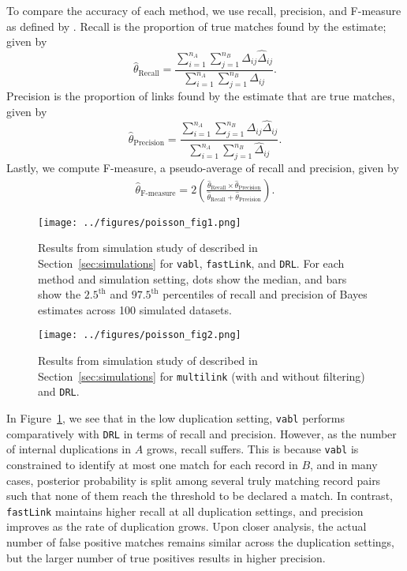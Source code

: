 \documentclass[12pt,letterpaper]{article}
\newcommand{\1}[1]{\mathbb{I}\!\left[#1\right]} %
\begin{document}
To compare the accuracy of each method, we use recall, precision, and F-measure as defined by \cite{christen_data_2012}. Recall is the proportion of true matches found by the estimate; given by
$$\hat{\theta}_{\text{Recall}} = \frac{\sum_{i=1}^{n_A}\sum_{j=1}^{n_B} \Delta_{ij} \hat{\Delta}_{ij}}{\sum_{i=1}^{n_A}\sum_{j=1}^{n_B} \Delta_{ij}}.$$
Precision is the proportion of links found by the estimate that are true matches, given by
$$\hat{\theta}_{\text{Precision}} = \frac{\sum_{i=1}^{n_A}\sum_{j=1}^{n_B}\Delta_{ij}\hat{\Delta}_{ij}}{\sum_{i=1}^{n_A}\sum_{j=1}^{n_B} \hat{\Delta}_{ij}}.$$
Lastly, we compute F-measure, a pseudo-average of recall and precision, given by 
\begin{align*}
	\hat{\theta}_{\text{F-measure}} = 2 \left(\frac{\hat{\theta}_{\text{Recall}} \times \hat{\theta}_{\text{Precision}}}{\hat{\theta}_{\text{Recall}} +  \hat{\theta}_{\text{Precision}}}\right).
\end{align*}

\begin{figure}[t]
	\centering
	\texttt{[image: ../figures/poisson\_fig1.png]}
	\caption{Results from simulation study of described in Section~\ref{sec:simulations} for \texttt{vabl}, \texttt{fastLink}, and \texttt{DRL}. For each method and simulation setting, dots show the median, and bars show the $2.5^{\text{th}}$ and $97.5^{\text{th}}$ percentiles of recall and precision of Bayes estimates across 100 simulated datasets.}
	\label{fig:sim-vabl-comparison}
\end{figure}

\begin{figure}
	\centering
	\texttt{[image: ../figures/poisson\_fig2.png]}
	\caption{Results from simulation study of described in Section~\ref{sec:simulations} for \texttt{multilink} (with and without filtering) and \texttt{DRL}.}
	\label{fig:sim-multilink-comparison}
\end{figure}

In Figure~\ref{fig:sim-vabl-comparison}, we see that in the low duplication setting, \texttt{vabl} performs comparatively with \texttt{DRL} in terms of recall and precision. However, as the number of internal duplications in $A$ grows, recall suffers. This is because \texttt{vabl} is constrained to identify at most one match for each record in $B$, and in many cases, posterior probability is split among several truly matching record pairs such that none of them reach the threshold to be declared a match. In contrast, \texttt{fastLink} maintains higher recall at all duplication settings, and precision improves as the rate of duplication grows. Upon closer analysis, the actual number of false positive matches remains similar across the duplication settings, but the larger number of true positives results in higher precision. 
\end{document}
